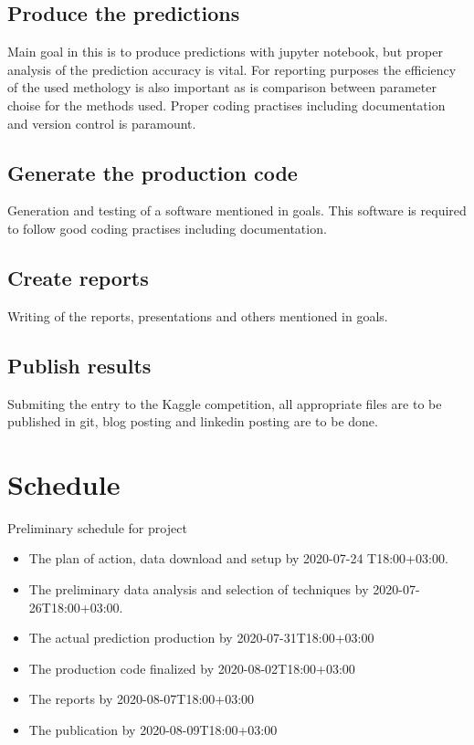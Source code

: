 \documentclass{article}
\begin{document}
\subsection{Produce the predictions}
Main goal in this is to produce predictions with jupyter notebook, but proper analysis of the prediction accuracy is vital. For reporting purposes the efficiency of the used methology is also important as is comparison between parameter choise for the methods used. Proper coding practises including documentation and version control is paramount.

\subsection{Generate the production code}
Generation and testing of a software mentioned in goals. This software is required to follow good coding practises including documentation.

\subsection{Create reports}
Writing of the reports, presentations and others mentioned in goals.
 
\subsection{Publish results}
Submiting the entry to the Kaggle competition, all appropriate files are to be published in git, blog posting and linkedin posting are to be done.

\section{Schedule}
Preliminary schedule for project
\begin{itemize}
	\item The plan of action, data download and setup by 2020-07-24 T18:00+03:00.
	\item The preliminary data analysis and selection of techniques by 2020-07-26T18:00+03:00.
	\item The actual prediction production by 2020-07-31T18:00+03:00
	\item The production code finalized by 2020-08-02T18:00+03:00
	\item The reports by 2020-08-07T18:00+03:00
	\item The publication by 2020-08-09T18:00+03:00
\end{itemize}
\end{document}
